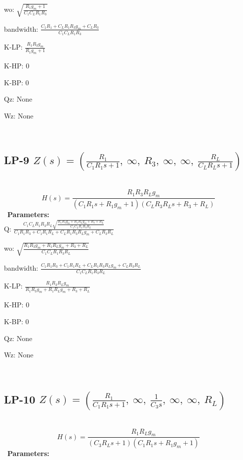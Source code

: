 \documentclass{article}
\begin{document}
wo: $\sqrt{\frac{R_{1} g_{m} + 1}{C_{1} C_{L} R_{1} R_{3}}}$\ 

bandwidth: $\frac{C_{1} R_{1} + C_{L} R_{1} R_{3} g_{m} + C_{L} R_{3}}{C_{1} C_{L} R_{1} R_{3}}$\ 

K-LP: $\frac{R_{1} R_{3} g_{m}}{R_{1} g_{m} + 1}$\ 

K-HP: $0$\ 

K-BP: $0$\ 

Qz: $\text{None}$\ 

Wz: $\text{None}$\ 

\ 

\subsection{LP-9 $Z(s) = \left( \frac{R_{1}}{C_{1} R_{1} s + 1}, \  \infty, \  R_{3}, \  \infty, \  \infty, \  \frac{R_{L}}{C_{L} R_{L} s + 1}\right)$ } \ 
\textbf{\[H(s) = \frac{R_{1} R_{3} R_{L} g_{m}}{\left(C_{1} R_{1} s + R_{1} g_{m} + 1\right) \left(C_{L} R_{3} R_{L} s + R_{3} + R_{L}\right)}\] } \ 
\textbf{Parameters:}\\ 

Q: $\frac{C_{1} C_{L} R_{1} R_{3} R_{L} \sqrt{\frac{R_{1} R_{3} g_{m} + R_{1} R_{L} g_{m} + R_{3} + R_{L}}{C_{1} C_{L} R_{1} R_{3} R_{L}}}}{C_{1} R_{1} R_{3} + C_{1} R_{1} R_{L} + C_{L} R_{1} R_{3} R_{L} g_{m} + C_{L} R_{3} R_{L}}$\ 

wo: $\sqrt{\frac{R_{1} R_{3} g_{m} + R_{1} R_{L} g_{m} + R_{3} + R_{L}}{C_{1} C_{L} R_{1} R_{3} R_{L}}}$\ 

bandwidth: $\frac{C_{1} R_{1} R_{3} + C_{1} R_{1} R_{L} + C_{L} R_{1} R_{3} R_{L} g_{m} + C_{L} R_{3} R_{L}}{C_{1} C_{L} R_{1} R_{3} R_{L}}$\ 

K-LP: $\frac{R_{1} R_{3} R_{L} g_{m}}{R_{1} R_{3} g_{m} + R_{1} R_{L} g_{m} + R_{3} + R_{L}}$\ 

K-HP: $0$\ 

K-BP: $0$\ 

Qz: $\text{None}$\ 

Wz: $\text{None}$\ 

\ 

\subsection{LP-10 $Z(s) = \left( \frac{R_{1}}{C_{1} R_{1} s + 1}, \  \infty, \  \frac{1}{C_{3} s}, \  \infty, \  \infty, \  R_{L}\right)$ } \ 
\textbf{\[H(s) = \frac{R_{1} R_{L} g_{m}}{\left(C_{3} R_{L} s + 1\right) \left(C_{1} R_{1} s + R_{1} g_{m} + 1\right)}\] } \ 
\textbf{Parameters:}\\ 
\end{document}
